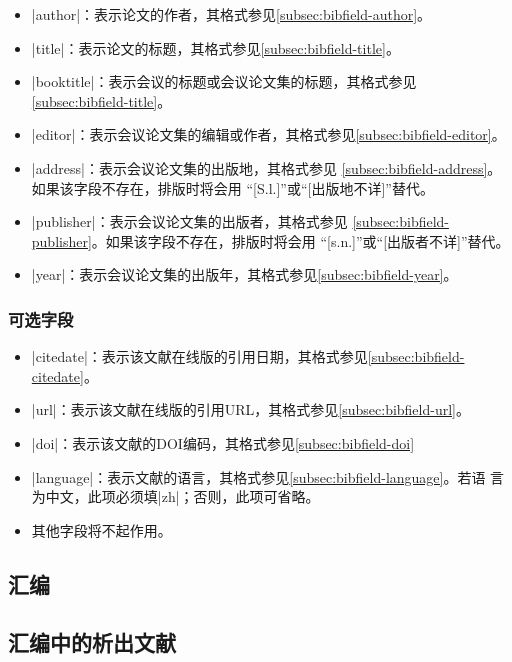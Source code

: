 \begin{itemize}
\item |author|：表示论文的作者，其格式参见\ref{subsec:bibfield-author}。
\item |title|：表示论文的标题，其格式参见\ref{subsec:bibfield-title}。
\item |booktitle|：表示会议的标题或会议论文集的标题，其格式参见\ref{subsec:bibfield-title}。
\item |editor|：表示会议论文集的编辑或作者，其格式参见\ref{subsec:bibfield-editor}。
\item |address|：表示会议论文集的出版地，其格式参见
  \ref{subsec:bibfield-address}。如果该字段不存在，{\BibTeX}排版时将会用
  ``[S.l.]''或``[出版地不详]''替代。
\item |publisher|：表示会议论文集的出版者，其格式参见
  \ref{subsec:bibfield-publisher}。如果该字段不存在，{\BibTeX}排版时将会用
  ``[s.n.]''或``[出版者不详]''替代。
\item |year|：表示会议论文集的出版年，其格式参见\ref{subsec:bibfield-year}。
\end{itemize}

\subsubsection{可选字段}

\begin{itemize}
\item |citedate|：表示该文献在线版的引用日期，其格式参见\ref{subsec:bibfield-citedate}。
\item |url|：表示该文献在线版的引用URL，其格式参见\ref{subsec:bibfield-url}。
\item |doi|：表示该文献的DOI编码，其格式参见\ref{subsec:bibfield-doi}
\item |language|：表示文献的语言，其格式参见\ref{subsec:bibfield-language}。若语
  言为中文，此项必须填|zh|；否则，此项可省略。
\item 其他字段将不起作用。
\end{itemize}

\subsection{汇编}\label{subsec:bibtype-collection}

\subsection{汇编中的析出文献}\label{subsec:bibtype-proceedings}

